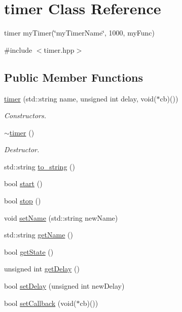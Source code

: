 \hypertarget{classtimer}{}\section{timer Class Reference}
\label{classtimer}


timer my\+Timer(\char`\"{}my\+Timer\+Name\char`\"{}, 1000, my\+Func)  




{\ttfamily \#include $<$timer.\+hpp$>$}

\subsection*{Public Member Functions}
\begin{DoxyCompactItemize}
\item 
\hyperlink{classtimer_ac478d66266a60195b83059b1f7447c7b}{timer} (std\+::string name, unsigned int delay, void($\ast$cb)())
\begin{DoxyCompactList}\small\item\em Constructors. \end{DoxyCompactList}\item 
\mbox{\label{classtimer_aee05958ea6b0fbf36ea1fd22747cd546}} 
\hyperlink{classtimer_aee05958ea6b0fbf36ea1fd22747cd546}{$\sim$timer} ()
\begin{DoxyCompactList}\small\item\em Destructor. \end{DoxyCompactList}\item 
std\+::string \hyperlink{classtimer_a8c068c53de6269fc3ced75cf27bf4ea6}{to\+\_\+string} ()
\item 
bool \hyperlink{classtimer_adad85b4705278d4cb8a2a4f3286cc2c7}{start} ()
\item 
bool \hyperlink{classtimer_ad21a0c9113d870f8485b775f1fcd3c73}{stop} ()
\item 
void \hyperlink{classtimer_ae3dce84bbcd9a7022a20e2b63174aa61}{set\+Name} (std\+::string new\+Name)
\item 
std\+::string \hyperlink{classtimer_a30d5e497b9bee9b2d00c7f511c85e84d}{get\+Name} ()
\item 
bool \hyperlink{classtimer_a35c72b981bb55b98e979f83a988f434c}{get\+State} ()
\item 
unsigned int \hyperlink{classtimer_ab00cba4ccf638a425b9f6db10d2fd16f}{get\+Delay} ()
\item 
bool \hyperlink{classtimer_acd8ddd948bf96185cf3c1e0a4cf60264}{set\+Delay} (unsigned int new\+Delay)
\item 
bool \hyperlink{classtimer_a68517332f9664a28d04df45911127d1a}{set\+Callback} (void($\ast$cb)())
\end{DoxyCompactItemize}


